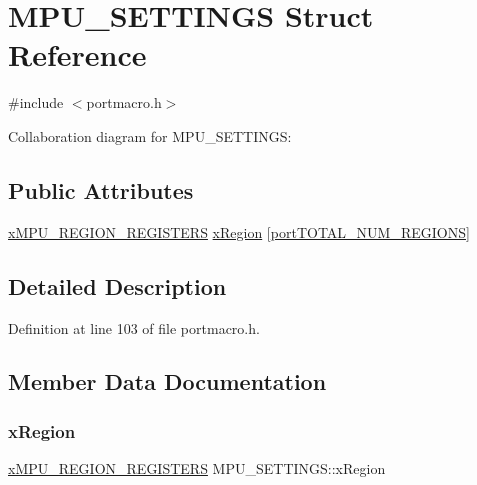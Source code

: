 \hypertarget{struct_m_p_u___s_e_t_t_i_n_g_s}{}\section{M\+P\+U\+\_\+\+S\+E\+T\+T\+I\+N\+GS Struct Reference}
\label{struct_m_p_u___s_e_t_t_i_n_g_s}


{\ttfamily \#include $<$portmacro.\+h$>$}



Collaboration diagram for M\+P\+U\+\_\+\+S\+E\+T\+T\+I\+N\+GS\+:
\subsection*{Public Attributes}
\begin{DoxyCompactItemize}
\item 
\hyperlink{externals_2freertos_2portable_2_g_c_c_2_a_r_m___c_m3___m_p_u_2portmacro_8h_a28e2341640d210b3e4893ca3c8f82760}{x\+M\+P\+U\+\_\+\+R\+E\+G\+I\+O\+N\+\_\+\+R\+E\+G\+I\+S\+T\+E\+RS} \hyperlink{struct_m_p_u___s_e_t_t_i_n_g_s_a2a9a5a281e3dc50a17c883307b7933e7}{x\+Region} \mbox{[}\hyperlink{externals_2freertos_2portable_2_g_c_c_2_a_r_m___c_m4___m_p_u_2portmacro_8h_ae12a3a7fad41e9756e95b6cac92a9af0}{port\+T\+O\+T\+A\+L\+\_\+\+N\+U\+M\+\_\+\+R\+E\+G\+I\+O\+NS}\mbox{]}
\end{DoxyCompactItemize}


\subsection{Detailed Description}


Definition at line 103 of file portmacro.\+h.



\subsection{Member Data Documentation}
\mbox{\label{struct_m_p_u___s_e_t_t_i_n_g_s_a2a9a5a281e3dc50a17c883307b7933e7}} 
\subsubsection{\texorpdfstring{x\+Region}{xRegion}}
{\footnotesize\ttfamily \hyperlink{externals_2freertos_2portable_2_g_c_c_2_a_r_m___c_m3___m_p_u_2portmacro_8h_a28e2341640d210b3e4893ca3c8f82760}{x\+M\+P\+U\+\_\+\+R\+E\+G\+I\+O\+N\+\_\+\+R\+E\+G\+I\+S\+T\+E\+RS} M\+P\+U\+\_\+\+S\+E\+T\+T\+I\+N\+G\+S\+::x\+Region}




